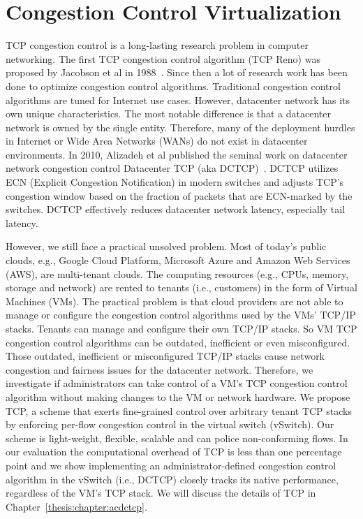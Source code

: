 \section{Congestion Control Virtualization}
TCP congestion control is a long-lasting research problem in computer networking. 
The first TCP congestion control algorithm (TCP Reno) was proposed by Jacobson et al in 1988~\cite{jacobson1988congestion}. 
Since then a lot of research work has been done to optimize congestion control algorithms. 
Traditional congestion control algorithms are tuned for Internet use cases. However, 
datacenter network has its own unique characteristics. The most notable difference 
is that a datacenter network is owned by the single entity. Therefore, many of the deployment 
hurdles in Internet or Wide Area Networks (WANs) do not exist in datacenter environments. 
In 2010, Alizadeh et al published the seminal work on datacenter network congestion 
control \textemdash\xspace Datacenter TCP (aka DCTCP)~\cite{alizadeh2010data}. 
DCTCP utilizes ECN (Explicit Congestion Notification) in 
modern switches and adjusts TCP's congestion window based on the fraction of 
packets that are ECN-marked by the switches. DCTCP effectively reduces datacenter network latency, especially tail latency.

However, we still face a practical unsolved problem. Most of today's public clouds, e.g., 
Google Cloud Platform, Microsoft Azure and Amazon Web Services (AWS), are multi-tenant clouds. 
The computing resources (e.g., CPUs, memory, storage and network) are rented to 
tenants (i.e., customers) in the form of Virtual Machines (VMs). The practical problem is 
that cloud providers are not able to manage or configure the congestion control algorithms used 
by the VMs' TCP/IP stacks. Tenants can manage and configure their own TCP/IP stacks. So VM TCP congestion 
control algorithms can be outdated, inefficient or even misconfigured. Those outdated, inefficient or 
misconfigured TCP/IP stacks cause network congestion and fairness issues for the datacenter network. 
Therefore, we investigate if administrators can take control of a VM's
TCP congestion control algorithm without making changes
to the VM or network hardware. We propose \acdc{} TCP,
a scheme that exerts fine-grained control over arbitrary tenant
TCP stacks by enforcing per-flow congestion control in
the virtual switch (vSwitch). Our scheme is light-weight,
flexible, scalable and can police non-conforming flows. In
our evaluation the computational overhead of \acdc{} TCP
is less than one percentage point and we show implementing
an administrator-defined congestion control algorithm in the
vSwitch (i.e., DCTCP) closely tracks its native performance,
regardless of the VM's TCP stack.
We will discuss the details of \acdc{} TCP in Chapter~\ref{thesis:chapter:acdctcp}.

